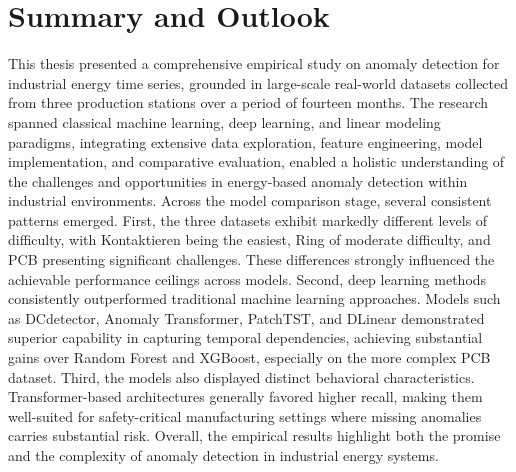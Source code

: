 \section{ Summary and Outlook}
This thesis presented a comprehensive empirical study on anomaly detection for industrial energy time series, grounded in large-scale real-world datasets collected from three production stations over a period of fourteen months. The research spanned classical machine learning, deep learning, and linear modeling paradigms, integrating extensive data exploration, feature engineering, model implementation, and comparative evaluation, enabled a holistic understanding of the challenges and opportunities in energy-based anomaly detection within industrial environments.
Across the model comparison stage, several consistent patterns emerged. First, the three datasets exhibit markedly different levels of difficulty, with Kontaktieren being the easiest, Ring of moderate difficulty, and PCB presenting significant challenges. These differences strongly influenced the achievable performance ceilings across models. Second, deep learning methods consistently outperformed traditional machine learning approaches. Models such as DCdetector, Anomaly Transformer, PatchTST, and DLinear demonstrated superior capability in capturing temporal dependencies, achieving substantial gains over Random Forest and XGBoost, especially on the more complex PCB dataset. Third, the models also displayed distinct behavioral characteristics. Transformer-based architectures generally favored higher recall, making them well-suited for safety-critical manufacturing settings where missing anomalies carries substantial risk.
Overall, the empirical results highlight both the promise and the complexity of anomaly detection in industrial energy systems.

